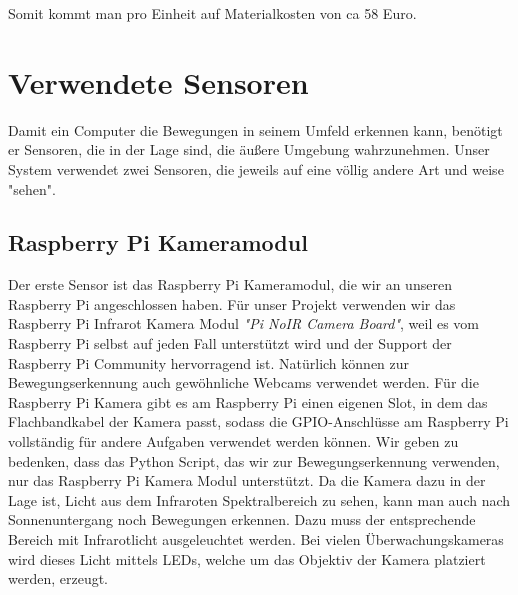 \documentclass[9pt,a4paper]{IEEEtran}
\begin{document}
Somit kommt man pro Einheit auf Materialkosten von ca 58 Euro.

\section{Verwendete Sensoren}
Damit ein Computer die Bewegungen in seinem Umfeld erkennen kann, benötigt er Sensoren, die in der Lage sind, die äußere Umgebung wahrzunehmen. 
Unser System verwendet zwei Sensoren, die jeweils auf eine völlig andere Art und weise "sehen". 

\subsection{Raspberry Pi Kameramodul}
Der erste Sensor ist das Raspberry Pi Kameramodul, die wir an unseren Raspberry Pi angeschlossen haben. 
Für unser Projekt verwenden wir das Raspberry Pi Infrarot Kamera Modul \textit{"Pi NoIR Camera Board"}, weil es vom Raspberry Pi selbst auf jeden Fall unterstützt wird und der Support der Raspberry Pi Community hervorragend ist. 
Natürlich können zur Bewegungserkennung auch gewöhnliche Webcams verwendet werden. 
Für die Raspberry Pi Kamera gibt es am Raspberry Pi einen eigenen Slot, in dem das Flachbandkabel der Kamera passt, sodass die GPIO-Anschlüsse am Raspberry Pi vollständig für andere Aufgaben verwendet werden können.
Wir geben zu bedenken, dass das Python Script, das wir zur Bewegungserkennung verwenden, nur das Raspberry Pi Kamera Modul unterstützt. 
Da die Kamera dazu in der Lage ist, Licht aus dem Infraroten Spektralbereich zu sehen, kann man auch nach Sonnenuntergang noch Bewegungen erkennen.
Dazu muss der entsprechende Bereich mit Infrarotlicht ausgeleuchtet werden.
Bei vielen Überwachungskameras wird dieses Licht mittels LEDs, welche um das Objektiv der Kamera platziert werden, erzeugt.
\end{document}

